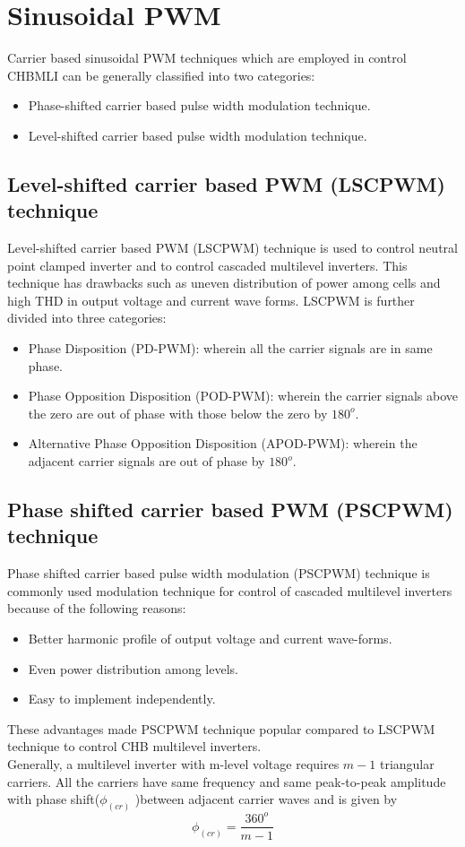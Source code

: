 \section{Sinusoidal PWM}
Carrier based sinusoidal PWM techniques which are employed in control CHBMLI can be
generally classified into two categories:
\begin{itemize}
\item Phase-shifted carrier based pulse width modulation technique.
\item Level-shifted carrier based pulse width modulation technique.
\end{itemize}
\subsection{Level-shifted carrier based PWM (LSCPWM) technique}
Level-shifted carrier based PWM (LSCPWM) technique is used to control neutral point clamped inverter and to control cascaded multilevel inverters. This technique has drawbacks such as uneven distribution of power among cells and high THD in output voltage and current wave forms.
LSCPWM is further divided into three categories:
\begin{itemize}
\item Phase Disposition (PD-PWM):
 wherein all the carrier signals are in same phase.
\item Phase Opposition Disposition (POD-PWM):
wherein the carrier signals above the zero are out of phase with those below the zero by $180^o$.
\item Alternative Phase Opposition Disposition (APOD-PWM):
 wherein the adjacent carrier signals are out of phase by $180^o$.
\end{itemize}
\subsection{Phase shifted carrier based PWM (PSCPWM) technique}
 Phase shifted carrier based pulse width modulation
(PSCPWM) technique is commonly used modulation technique for
control of cascaded multilevel inverters because of the following
reasons:
\begin{itemize}
\item Better harmonic profile of output voltage and current
wave-forms.
\item Even power distribution among levels.
\item Easy to implement independently. 
\end{itemize}
These advantages made PSCPWM technique popular compared to LSCPWM technique to control CHB multilevel inverters.\\
Generally, a multilevel inverter with m-level voltage requires $m-1$ triangular carriers. All the carriers have same frequency and same peak-to-peak amplitude with phase shift($\phi_(cr)$ )between adjacent carrier waves  and is given by
$$\phi_(cr)=\frac{360^o}{m-1} $$

